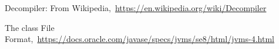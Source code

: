 \cleardoublepage
{}
{}
\begin{thebibliography}{99}

Decompiler: From Wikipedia,\ \url{https://en.wikipedia.org/wiki/Decompiler}

The class File Format,\ \url{https://docs.oracle.com/javase/specs/jvms/se8/html/jvms-4.html}

\end{thebibliography}
